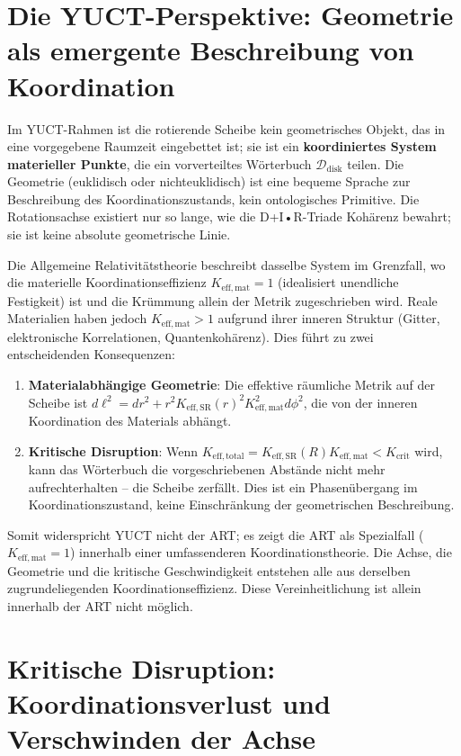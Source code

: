 \documentclass[12pt,a4paper]{article}
\begin{document}
	\section{Die YUCT-Perspektive: Geometrie als emergente Beschreibung von Koordination}
	
	Im YUCT-Rahmen ist die rotierende Scheibe kein geometrisches Objekt, das in eine vorgegebene Raumzeit eingebettet ist; sie ist ein \textbf{koordiniertes System materieller Punkte}, die ein vorverteiltes Wörterbuch \(\mathcal{D}_{\text{disk}}\) teilen. Die Geometrie (euklidisch oder nichteuklidisch) ist eine bequeme Sprache zur Beschreibung des Koordinationszustands, kein ontologisches Primitive. Die Rotationsachse existiert nur so lange, wie die D+I•R-Triade Kohärenz bewahrt; sie ist keine absolute geometrische Linie.
	
	Die Allgemeine Relativitätstheorie beschreibt dasselbe System im Grenzfall, wo die materielle Koordinationseffizienz \(K_{\mathrm{eff,mat}} = 1\) (idealisiert unendliche Festigkeit) ist und die Krümmung allein der Metrik zugeschrieben wird. Reale Materialien haben jedoch \(K_{\mathrm{eff,mat}} > 1\) aufgrund ihrer inneren Struktur (Gitter, elektronische Korrelationen, Quantenkohärenz). Dies führt zu zwei entscheidenden Konsequenzen:
	
	\begin{enumerate}
		\item \textbf{Materialabhängige Geometrie}: Die effektive räumliche Metrik auf der Scheibe ist \(d\ell^2 = dr^2 + r^2 K_{\mathrm{eff,SR}}(r)^2 K_{\mathrm{eff,mat}}^2 d\phi^2\), die von der inneren Koordination des Materials abhängt.
		\item \textbf{Kritische Disruption}: Wenn \(K_{\mathrm{eff,total}} = K_{\mathrm{eff,SR}}(R) K_{\mathrm{eff,mat}} < K_{\mathrm{crit}}\) wird, kann das Wörterbuch die vorgeschriebenen Abstände nicht mehr aufrechterhalten – die Scheibe zerfällt. Dies ist ein Phasenübergang im Koordinationszustand, keine Einschränkung der geometrischen Beschreibung.
	\end{enumerate}
	
	Somit widerspricht YUCT nicht der ART; es zeigt die ART als Spezialfall (\(K_{\mathrm{eff,mat}}=1\)) innerhalb einer umfassenderen Koordinationstheorie. Die Achse, die Geometrie und die kritische Geschwindigkeit entstehen alle aus derselben zugrundeliegenden Koordinationseffizienz. Diese Vereinheitlichung ist allein innerhalb der ART nicht möglich.
	
	\section{Kritische Disruption: Koordinationsverlust und Verschwinden der Achse}
	\label{sec:critical-disruption}
	
\end{document}
